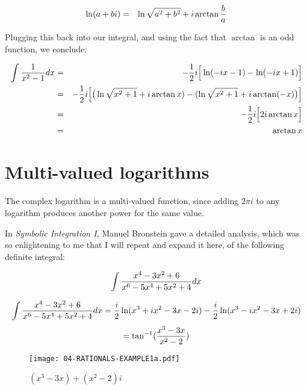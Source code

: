\begin{eqnarray*}
\ln(a+bi) &=& \ln\sqrt{a^2+b^2} +i\arctan{b\over a} \\
\end{eqnarray*}

Plugging this back into our integral, and using the fact that
$\arctan$ is an odd function, we conclude:

\begin{eqnarray*}
\int{1\over{x^2-1}}dx &=& -{1\over2}i\Big[\ln(-ix-1) - \ln(-ix+1)\Big] \\
&=& -{1\over2}i \Big[\big(\ln\sqrt{x^2+1} + i\arctan{x}) - (\ln\sqrt{x^2+1} + i\arctan(-x)\big) \Big] \\
&=& -{1\over2}i \Big[2 i\arctan{x} \Big] \\
&=& \arctan{x}
\end{eqnarray*}

\section{Multi-valued logarithms}

The complex logarithm is a multi-valued function, since adding $2\pi i$
to any logarithm produces another power for the same value.

In {\it Symbolic Integration I}, Manuel Bronstein gave a detailed
analysis, which was so enlightening to me that I will repeat
and expand it here, of the following definite integral:


$$\int {{x^4-3x^2+6}\over{x^6-5x^4+5x^2+4}} dx $$



$$\int {{x^4-3x^2+6}\over{x^6-5x^4+5x^2+4}} dx =
   {i\over2}\ln(x^3+ix^2-3x-2i) - {i\over2}\ln(x^3-ix^2-3x+2i)$$
$$=\tan^{-1}({{x^3-3x}\over{x^2-2}})$$

\vfill

\begin{figure}[h]
\begin{center}
\texttt{[image: 04-RATIONALS-EXAMPLE1a.pdf]}
\end{center}
\caption{$(x^3-3x)+(x^2-2)i$}
\end{figure}

